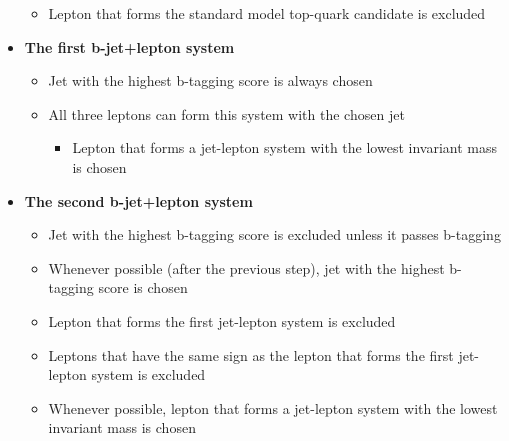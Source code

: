 \begin{itemize}
\begin{itemize}
\item Lepton that forms the standard model top-quark candidate is excluded 
\end{itemize}
\item \textbf{The first b-jet+lepton system }
\begin{itemize}
\item Jet with the highest b-tagging score is always chosen 
\item All three leptons can form this system with the chosen jet 
\begin{itemize}
\item Lepton that forms a jet-lepton system with the lowest invariant mass is chosen 
\end{itemize}
\end{itemize}
\item \textbf{The second b-jet+lepton system}
\begin{itemize}
\item Jet with the highest b-tagging score is excluded unless it passes b-tagging 
\item Whenever possible (after the previous step), jet with the highest b-tagging score is chosen 
\item Lepton that forms the first jet-lepton system is excluded 
\item Leptons that have the same sign as the lepton that forms the first jet-lepton system is excluded 
\item Whenever possible, lepton that forms a jet-lepton system with the lowest invariant mass is chosen 
\end{itemize}
\end{itemize}